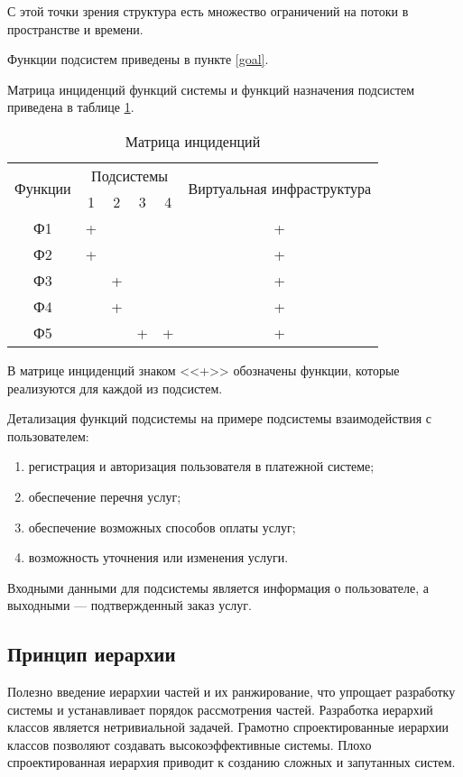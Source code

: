 С этой точки зрения структура есть множество ограничений на потоки в пространстве и времени.

Функции подсистем приведены в пункте \ref{goal}.

Матрица инциденций функций системы и функций назначения подсистем приведена в таблице \ref{inc-matrix}.
\begin{table}[H]
  \caption{Матрица инциденций}\label{inc-matrix}
  \begin{tabular}{|c|c|c|c|c|c|}
  \hline \multirow{2}{*}{Функции} & \multicolumn{4}{|c|}{Подсистемы} & \multirow{2}{*}{Виртуальная инфраструктура} \\
  \cline{2-5} & 1 & 2 & 3 & 4 & \\
  \hline Ф1 & + & & & & + \\
  \hline Ф2 & + & & & & + \\
  \hline Ф3 & & + & & & + \\
  \hline Ф4 & & + & & & + \\
  \hline Ф5 & & & + & + & + \\
  \hline 
  \end{tabular}
\end{table}

В матрице инциденций знаком <<+>> обозначены функции, которые реализуются для каждой из подсистем.

Детализация функций подсистемы на примере подсистемы взаимодействия с пользователем:
\begin{enumerate}
  \item регистрация и авторизация пользователя в платежной системе;
  \item обеспечение перечня услуг;
  \item обеспечение возможных способов оплаты услуг;
  \item возможность уточнения или изменения услуги.
\end{enumerate}

Входными данными для подсистемы является информация о пользователе, а выходными --- подтвержденный заказ услуг.

\subsection{Принцип иерархии}

Полезно введение иерархии частей и их ранжирование, что упрощает разработку системы и устанавливает порядок рассмотрения частей.
Разработка иерархий классов является нетривиальной задачей.
Грамотно спроектированные иерархии классов позволяют создавать высокоэффективные системы.
Плохо спроектированная иерархия приводит к созданию сложных и запутанных систем.

